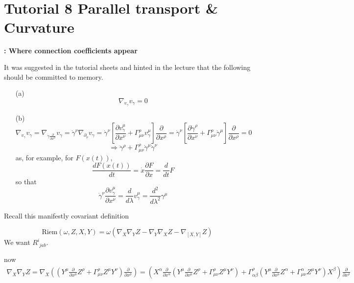 \section*{Tutorial 8 Parallel transport \& Curvature}


\textbf{: Where connection coefficients appear}

It was suggested in the tutorial sheets and hinted in the lecture that the following should be committed to memory.

\begin{enumerate}
\item[(a)] \[
\nabla_{v_{\gamma}} v_{\gamma} = 0 
\]
\item[(b)]
\[
\nabla_{v_{\gamma}} v_{\gamma} = \nabla_{ \dot{\gamma} \frac{ \partial }{ \partial x^{\mu}} } v_{\gamma} = \dot{\gamma}^{\nu} \nabla_{ \partial_{\nu}} v_{\gamma} = \dot{\gamma}^{\nu} \left[ \frac{ \partial v^{\mu}_{\gamma}}{ \partial x^{\nu} } + \Gamma^{\rho}_{\mu \nu} v_{\gamma}^{\mu} \right] \frac{ \partial }{ \partial x^{\rho }} = \dot{\gamma}^{\nu} \left[ \frac{ \partial \dot{\gamma}^{\rho }}{ \partial x^{\nu}} + \Gamma^{\rho}_{\mu \nu} \dot{\gamma}^{\mu} \right] \frac{ \partial }{ \partial x^{\rho }} = 0
\]
\[
\Longrightarrow \boxed{ \ddot{\gamma}^{\rho} + \Gamma^{\rho}_{\mu \nu} \dot{\gamma}^{\mu} \dot{\gamma}^{\nu} }
\]
as, for example, for $F(x(t))$, 
\[
\frac{dF(x(t))}{dt} = \dot{x} \frac{ \partial F}{ \partial x} = \frac{d}{dt} F
\]
so that 
\[
\dot{\gamma}^{\nu} \frac{ \partial v_{\gamma}^{\mu} }{ \partial x^{\nu}} = \frac{d}{d\lambda} v_{\gamma}^{\mu} = \frac{d^2}{d\lambda^2} \gamma^{\mu}
\]
\end{enumerate}


Recall this manifestly covariant definition

\[
\text{Riem}(\omega, Z,X,Y) = \omega ( \nabla_X \nabla_Y Z - \nabla_Y \nabla_X Z - \nabla_{[X,Y]}Z )
\]
We want $R^i_{ \, \, jab}$.  

now
\[
\begin{gathered}
  \nabla_X \nabla_Y Z = \nabla_X ( ( Y^{\mu} \frac{ \partial }{ \partial x^{\mu }} Z^{\rho} + \Gamma^{\rho}_{\mu \nu } Z^{\mu} Y^{\nu} ) \frac{\partial}{ \partial x^{\rho}} ) = (X^{\alpha} \frac{ \partial }{ \partial x^{\alpha}} (Y^{\mu} \frac{ \partial }{ \partial x^{\mu}} Z^{\rho} + \Gamma^{\rho}_{ \mu \nu} Z^{\mu} Y^{\nu}  ) + \Gamma^{\rho}_{\alpha \beta} (Y^{\mu} \frac{ \partial }{ \partial x^{\mu} } Z^{\alpha} + \Gamma^{\alpha}_{\mu \nu} Z^{\mu} Y^{\nu} ) X^{\beta} )\frac{\partial }{ \partial x^{\rho }}
\end{gathered}
\]

